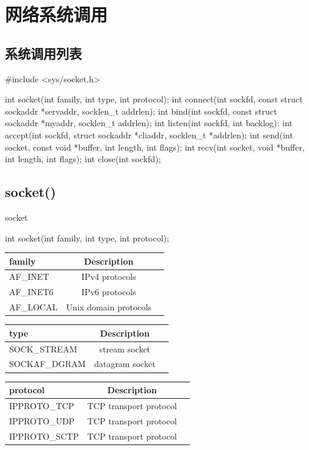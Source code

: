 \documentclass[UTF8]{beamer}
\begin{document}
\section{网络系统调用}
\subsection{系统调用列表}
\begin{frame}[fragile]
  \begin{ccode}
    #include <sys/socket.h>

    int socket(int family, int type, int protocol);
    int connect(int sockfd, const struct sockaddr *servaddr, socklen_t addrlen);
    int bind(int sockfd, const struct sockaddr *myaddr, socklen_t addrlen);
    int listen(int sockfd, int backlog);
    int accept(int sockfd, struct sockaddr *cliaddr, socklen_t *addrlen);
    int send(int socket, const void *buffer, int length, int flags);
    int recv(int socket, void *buffer, int length, int flags);
    int close(int sockfd);
  \end{ccode}
\end{frame}
\subsection{socket()}
\begin{frame}[fragile]{socket}
  \begin{ccode}
    int socket(int family, int type, int protocol);
  \end{ccode}
  \begin{center}
    \begin{tabular}{ | l | c | r }
      \hline
      family & Description \\ \hline
      AF\_INET & IPv4 protocols \\
      AF\_INET6 & IPv6 protocols \\
      AF\_LOCAL & Unix domain protocols \\
      \hline
    \end{tabular}
    \begin{tabular}{ | l | c | r }
      \hline
      type & Description \\ \hline
      SOCK\_STREAM & stream socket \\
      SOCKAF\_DGRAM & datagram socket \\
      \hline
    \end{tabular}
    \begin{tabular}{ | l | c | r }
      \hline
      protocol & Description \\ \hline
      IPPROTO\_TCP & TCP transport protocol \\
      IPPROTO\_UDP & TCP transport protocol \\
      IPPROTO\_SCTP & TCP transport protocol \\
      \hline
    \end{tabular}
  \end{center}
\end{frame}
\end{document}
